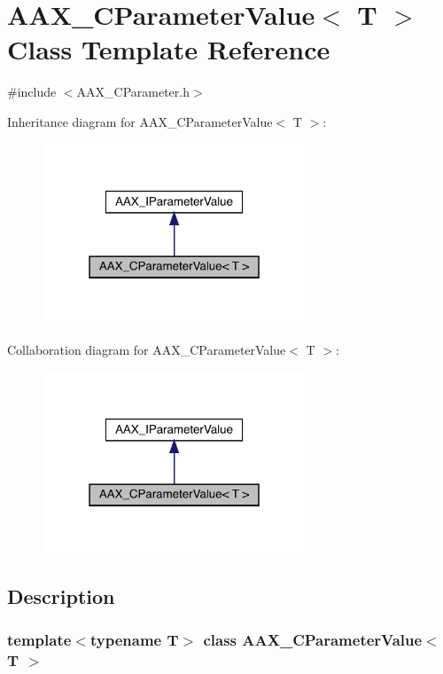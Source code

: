 \hypertarget{a01533}{}\section{A\+A\+X\+\_\+\+C\+Parameter\+Value$<$ T $>$ Class Template Reference}
\label{a01533}


{\ttfamily \#include $<$A\+A\+X\+\_\+\+C\+Parameter.\+h$>$}



Inheritance diagram for A\+A\+X\+\_\+\+C\+Parameter\+Value$<$ T $>$\+:
\nopagebreak
\begin{figure}[H]
\begin{center}
\leavevmode
\includegraphics[width=223pt]{a01532}
\end{center}
\end{figure}


Collaboration diagram for A\+A\+X\+\_\+\+C\+Parameter\+Value$<$ T $>$\+:
\nopagebreak
\begin{figure}[H]
\begin{center}
\leavevmode
\includegraphics[width=223pt]{a01531}
\end{center}
\end{figure}


\subsection{Description}
\subsubsection*{template$<$typename T$>$\newline
class A\+A\+X\+\_\+\+C\+Parameter\+Value$<$ T $>$}

